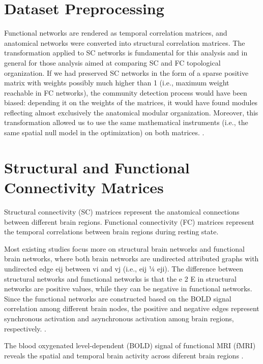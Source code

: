 
\section{Dataset Preprocessing}






Functional networks are rendered as temporal correlation matrices, and anatomical networks were converted into structural 
correlation matrices.
The transformation applied to SC networks is fundamental for this analysis and in general for those analysis aimed at 
comparing SC and FC topological organization. 
If we had preserved SC networks in the form of a sparse positive matrix with
weights possibly much higher than 1 (i.e., maximum weight reachable in FC networks), the community detection process would  
have been biased: depending it on the weights of the matrices, it would have found modules reflecting almost exclusively 
the anatomical modular organization.
Moreover, this transformation allowed us to use the same mathematical instruments (i.e., the same spatial null model in 
the optimization) on both matrices.
\cite{Puxeddu2022}.

\section{Structural and Functional Connectivity Matrices}
Structural connectivity (SC) matrices represent the anatomical connections between different brain regions.
Functional connectivity (FC) matrices represent the temporal correlations between brain regions during resting state.

Most existing studies focus more on structural brain networks 
and functional brain networks, where both brain networks are 
undirected attributed graphs with undirected edge eij between 
vi and vj (i.e., eij ¼ eji). The difference between structural
networks and functional networks is that the e 2 E in structural 
networks are positive values, while they can be negative in 
functional networks.
Since the functional networks are constructed based on the BOLD 
signal correlation among different brain nodes, the positive and 
negative edges represent synchronous activation and asynchronous 
activation among brain regions, respectively. \cite{Tang2023}.

The blood oxygenated level-dependent (BOLD) signal of functional MRI
(fMRI) reveals the spatial and temporal brain activity across diferent
brain regions \cite{Zhao2022}. 

